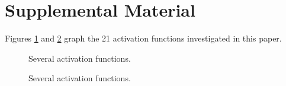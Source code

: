 \clearpage


\section{Supplemental Material}
Figures \ref{fig:saturating} and \ref{fig:nonsaturating} graph the 21 activation functions investigated in this paper.

\begin{figure}[!htb]
\scalebox{0.5}{
}
\scalebox{0.5}{

}
\caption{Several activation functions.}
\label{fig:saturating}
\end{figure}

\begin{figure}[!htb]
\scalebox{0.5}{
}
\scalebox{0.5}{

}
\caption{Several activation functions.}
\label{fig:nonsaturating}
\end{figure}